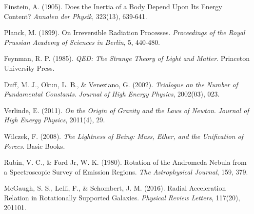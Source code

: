 \documentclass[12pt,a4paper]{article}
\begin{document}
\begin{thebibliography}{99}
		 Einstein, A. (1905). Does the Inertia of a Body Depend Upon Its Energy Content? \textit{Annalen der Physik}, 323(13), 639-641.
		
		 Planck, M. (1899). On Irreversible Radiation Processes. \textit{Proceedings of the Royal Prussian Academy of Sciences in Berlin}, 5, 440-480.
		
		 Feynman, R. P. (1985). \textit{QED: The Strange Theory of Light and Matter}. Princeton University Press.
		
		 Duff, M. J., Okun, L. B., \& Veneziano, G. (2002). \textit{Trialogue on the Number of Fundamental Constants}. \textit{Journal of High Energy Physics}, 2002(03), 023.
		
		 Verlinde, E. (2011). \textit{On the Origin of Gravity and the Laws of Newton}. \textit{Journal of High Energy Physics}, 2011(4), 29.
		
		 Wilczek, F. (2008). \textit{The Lightness of Being: Mass, Ether, and the Unification of Forces}. Basic Books.
		
		 Rubin, V. C., \& Ford Jr, W. K. (1980). Rotation of the Andromeda Nebula from a Spectroscopic Survey of Emission Regions. \textit{The Astrophysical Journal}, 159, 379.
		
		 McGaugh, S. S., Lelli, F., \& Schombert, J. M. (2016). Radial Acceleration Relation in Rotationally Supported Galaxies. \textit{Physical Review Letters}, 117(20), 201101.
	\end{thebibliography}
	
\end{document}
